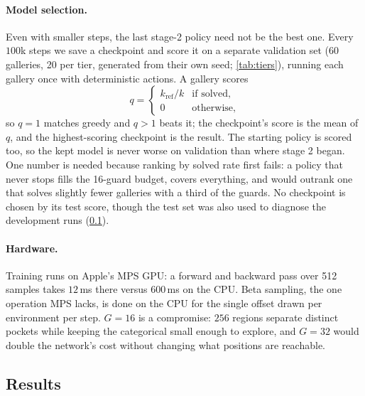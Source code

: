 \documentclass[11pt,a4paper]{article}
\begin{document}
\paragraph{Model selection.}
Even with smaller steps, the last stage-2 policy need not be the best one. Every $100$k
steps we save a checkpoint and score it on a separate validation set (60 galleries, 20 per
tier, generated from their own seed; \cref{tab:tiers}), running each gallery once with
deterministic actions. A gallery scores
\[
  q = \begin{cases} k_{\mathrm{ref}} / k & \text{if solved,}\\ 0 & \text{otherwise,}\end{cases}
\]
so $q = 1$ matches greedy and $q > 1$ beats it; the checkpoint's score is the mean of $q$, and
the highest-scoring checkpoint is the result. The starting policy is scored too, so the kept
model is never worse on validation than where stage 2 began. One number is needed because
ranking by solved rate first fails: a policy that never stops fills the 16-guard budget,
covers everything, and would outrank one that solves slightly fewer galleries with a third
of the guards. No checkpoint is chosen by its test score, though the test set was also used
to diagnose the development runs (\cref{sec:results}).

\paragraph{Hardware.}
Training runs on Apple's MPS GPU: a forward and
backward pass over 512 samples takes $12$\,ms there versus $600$\,ms on the CPU. Beta sampling,
the one operation MPS lacks, is done on the CPU for the single offset drawn per environment
per step. $G=16$ is a compromise: $256$ regions separate distinct pockets while keeping the
categorical small enough to explore, and $G=32$ would double the network's cost without
changing what positions are reachable.

\subsection{Results}\label{sec:results}

\end{document}

